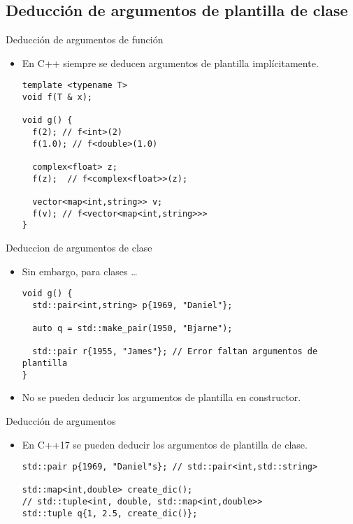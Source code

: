 \subsection{Deducción de argumentos de plantilla de clase}

\begin{frame}[t,fragile]{Deducción de argumentos de función}
\begin{itemize}
  \item En C++ siempre se deducen argumentos de plantilla implícitamente.
\begin{lstlisting}
template <typename T>
void f(T & x);

void g() {
  f(2); // f<int>(2)
  f(1.0); // f<double>(1.0)
   
  complex<float> z;
  f(z);  // f<complex<float>>(z);

  vector<map<int,string>> v;
  f(v); // f<vector<map<int,string>>>
}
\end{lstlisting}
\end{itemize}
\end{frame}

\begin{frame}[t,fragile]{Deduccion de argumentos de clase}
\begin{itemize}
  \item Sin embargo, para clases \ldots
\begin{lstlisting}
void g() {
  std::pair<int,string> p{1969, "Daniel"};

  auto q = std::make_pair(1950, "Bjarne");

  std::pair r{1955, "James"}; // Error faltan argumentos de plantilla
}
\end{lstlisting}

  \vfill
  \item No se pueden deducir los argumentos de plantilla en constructor.

\end{itemize}
\end{frame}

\begin{frame}[t,fragile]{Deducción de argumentos}
\begin{itemize}
  \item En C++17 se pueden deducir los argumentos de plantilla de clase.
\begin{lstlisting}
std::pair p{1969, "Daniel"s}; // std::pair<int,std::string>

std::map<int,double> create_dic();
// std::tuple<int, double, std::map<int,double>>
std::tuple q{1, 2.5, create_dic()};
\end{lstlisting}
\end{itemize}
\end{frame}

